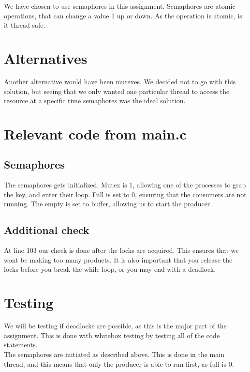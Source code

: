 We have chosen to use semaphores in this assignment. Semaphores are atomic operations, that can change a value 1 up or down. As the operation is atomic, is it thread safe.

\section{Alternatives}
Another alternative would have been mutexes. We decided not to go with this solution, but seeing that we only wanted one particular thread to access the resource at a specific time semaphores was the ideal solution. 

\section{Relevant code from main.c}
\subsection{Semaphores}
The semaphores gets initialized. 	
Mutex is 1, allowing one of the processes to grab the key, and enter their loop. Full is set to 0, ensuring that the consumers are not running. The empty is set to buffer, allowing us to start the producer.\\



\subsection{Additional check}
At line 103 our check is done after the locks are acquired. This ensures that we wont be making too many products. It is also important that you release the locks before you break the while loop, or you may end with a deadlock.




\section{Testing}

We will be testing if deadlocks are possible, as this is the major part of the assignment. This is done with whitebox testing by testing all of the code statements.\\

The semaphores are initiated as described above. This is done in the main thread, and this means that only the producer is able to run first, as full is 0.

